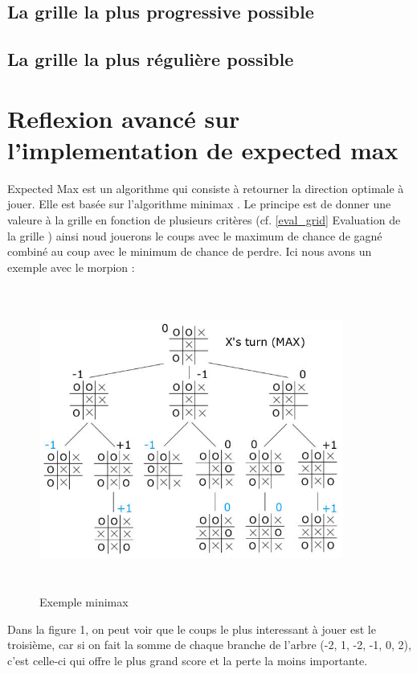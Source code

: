 \documentclass{article}
\begin{document}
	\subsection{La grille la plus progressive possible}

	\subsection{La grille la plus régulière possible}

\clearpage
\section{Reflexion avancé sur l'implementation de expected max}
\og Expected Max \fg{} est un algorithme qui consiste \`a retourner la direction optimale \`a jouer. Elle est bas\'ee sur l'algorithme \og minimax \fg{}. Le principe est de donner une valeure à la grille en fonction de plusieurs critères (cf. \og \ref{eval_grid} Evaluation de la grille \fg{}) ainsi noud jouerons le coups avec le maximum de chance de gagné combiné au coup avec le minimum de chance de perdre. Ici nous avons un exemple avec le morpion :

\begin{figure}[!h]
   \includegraphics[width=10cm,height=10cm]{minimax.jpg}
   \caption{\label{minimax} Exemple minimax}
\end{figure}

Dans la figure 1, on peut voir que le coups le plus interessant à jouer est le troisi\`eme, car si on fait la somme de chaque branche de l'arbre (-2, 1, -2, -1, 0, 2), c'est celle-ci qui offre le plus grand score et la perte la moins importante.
\end{document}
